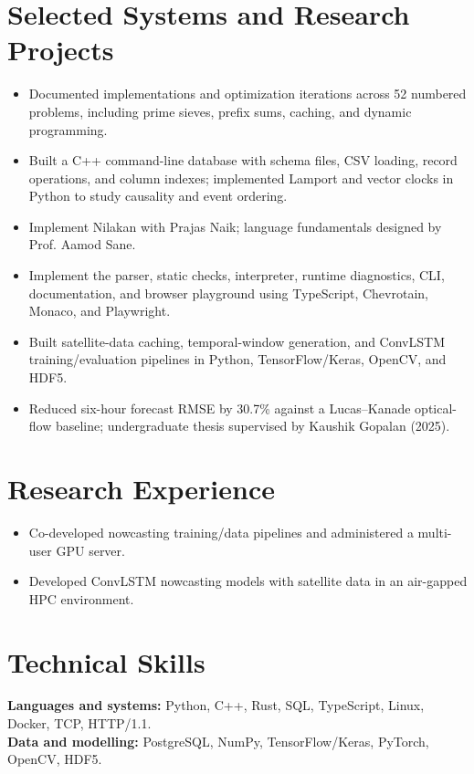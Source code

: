 \section{Selected Systems and Research Projects}
\begin{itemize}
  \item Documented implementations and optimization iterations across 52 numbered problems, including prime sieves, prefix sums, caching, and dynamic programming.
\end{itemize}
\begin{itemize}
  \item Built a C++ command-line database with schema files, CSV loading, record operations, and column indexes; implemented Lamport and vector clocks in Python to study causality and event ordering.
\end{itemize}
\begin{itemize}
  \item Implement Nilakan with Prajas Naik; language fundamentals designed by Prof. Aamod Sane.
  \item Implement the parser, static checks, interpreter, runtime diagnostics, CLI, documentation, and browser playground using TypeScript, Chevrotain, Monaco, and Playwright.
\end{itemize}
\begin{itemize}
  \item Built satellite-data caching, temporal-window generation, and ConvLSTM training/evaluation pipelines in Python, TensorFlow/Keras, OpenCV, and HDF5.
  \item Reduced six-hour forecast RMSE by 30.7\% against a Lucas--Kanade optical-flow baseline; undergraduate thesis supervised by Kaushik Gopalan (2025).
\end{itemize}
\section{Research Experience}
\begin{itemize}
  \item Co-developed nowcasting training/data pipelines and administered a multi-user GPU server.
\end{itemize}
\begin{itemize}
  \item Developed ConvLSTM nowcasting models with satellite data in an air-gapped HPC environment.
\end{itemize}
\section{Technical Skills}
\textbf{Languages and systems:} Python, C++, Rust, SQL, TypeScript, Linux, Docker, TCP, HTTP/1.1.\\
\textbf{Data and modelling:} PostgreSQL, NumPy, TensorFlow/Keras, PyTorch, OpenCV, HDF5.

